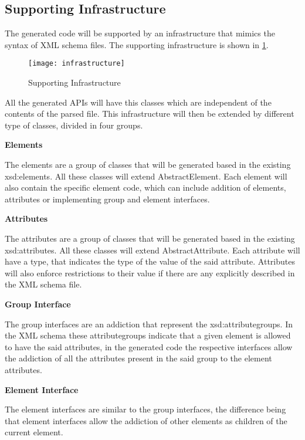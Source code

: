 \newpage

\subsection{Supporting Infrastructure}

The generated code will be supported by an infrastructure that mimics the syntax of XML schema files. The supporting infrastructure is shown in \ref{Infrastructure}.

\begin{figure}[h]
	\centering
	\texttt{[image: infrastructure]}
	\caption{Supporting Infrastructure}
	\label{Infrastructure}
\end{figure}

\noindent
All the generated APIs will have this classes which are independent of the contents of the parsed file. This infrastructure will then be extended by different type of classes, divided in four groups.

\textbf{Elements}

The elements are a group of classes that will be generated based in the existing xsd:elements. All these classes will extend AbstractElement. Each element will also contain the specific element code, which can include addition of elements, attributes or implementing group and element interfaces.

\textbf{Attributes}

The attributes are a group of classes that will be generated based in the existing xsd:attributes. All these classes will extend AbstractAttribute. Each attribute will have a type, that indicates the type of the value of the said attribute. Attributes will also enforce restrictions to their value if there are any explicitly described in the XML schema file.

\textbf{Group Interface}

The group interfaces are an addiction that represent the xsd:attributegroups. In the XML schema these attributegroups indicate that a given element is allowed to have the said attributes, in the generated code the respective interfaces allow the addiction of all the attributes present in the said group to the element attributes.

\textbf{Element Interface}

The element interfaces are similar to the group interfaces, the difference being that element interfaces allow the addiction of other elements as children of the current element. 

